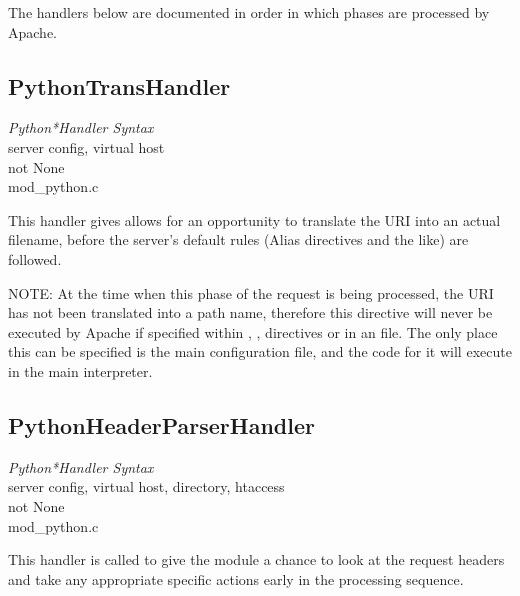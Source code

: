  The handlers below are documented in order in
which phases are processed by Apache.

\subsection{PythonTransHandler\label{dir-handlers-th}}

\emph{Python*Handler Syntax}\\
server config, virtual host\\
not None\\
mod_python.c

This handler gives allows for an opportunity to translate the URI into
an actual filename, before the server's default rules (Alias
directives and the like) are followed.

NOTE: At the time when this phase of the request is being processed,
the URI has not been translated into a path name, therefore this
directive will never be executed by Apache if specified within
, ,  directives or in
an  file. The only place this can be specified is the
main configuration file, and the code for it will execute in the
main interpreter.

\subsection{PythonHeaderParserHandler\label{dir-handlers-hph}}

\emph{Python*Handler Syntax}\\
server config, virtual host, directory, htaccess\\
not None\\
mod_python.c

This handler is called to give the module a chance to look at the
request headers and take any appropriate specific actions early in the
processing sequence.

